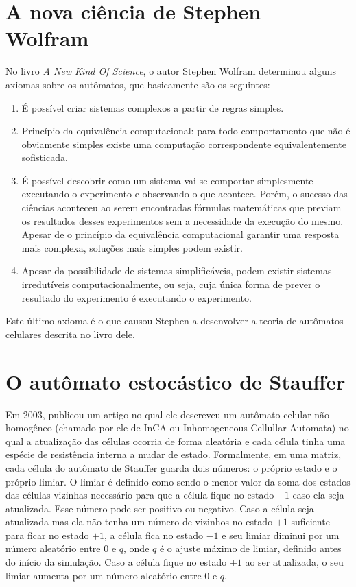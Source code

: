 \documentclass[
	12pt,				%
	openright,			%
	twoside,			%
	a4paper,			%
	english,			%
	french,				%
	spanish,			%
	brazil				%
	]{abntex2}
\begin{document}
\section*{A nova ciência de Stephen Wolfram}

No livro \textit{A New Kind Of Science}, o autor Stephen Wolfram \cite{wolfram} determinou alguns axiomas sobre os autômatos, que basicamente são os seguintes:
\begin{enumerate}
	\item É possível criar sistemas complexos a partir de regras simples.
	\item Princípio da equivalência computacional: para todo comportamento que não é obviamente simples  existe uma computação correspondente equivalentemente sofisticada.
	\item É possível descobrir como um sistema vai se comportar simplesmente executando o experimento e observando o que acontece. Porém, o sucesso das ciências aconteceu ao serem encontradas fórmulas matemáticas que previam os resultados desses experimentos sem a necessidade da execução do mesmo. Apesar de o princípio da equivalência computacional garantir uma resposta mais complexa, soluções mais simples podem existir.
	\item Apesar da possibilidade de sistemas simplificáveis, podem existir sistemas irredutíveis computacionalmente, ou seja, cuja única forma de prever o resultado do experimento é executando o experimento.
\end{enumerate}
Este último axioma é o que causou Stephen a desenvolver a teoria de autômatos celulares descrita no livro dele.

\section*{O autômato estocástico de Stauffer}

Em 2003,  publicou um artigo no qual ele descreveu um autômato celular não-homogêneo (chamado por ele de InCA ou Inhomogeneous Cellullar Automata) no qual a atualização das células ocorria de forma aleatória e cada célula tinha uma espécie de resistência interna a mudar de estado. Formalmente, em uma matriz, cada célula do autômato de Stauffer guarda dois números: o próprio estado e o próprio limiar. O limiar é definido como sendo o menor valor da soma dos estados das células vizinhas necessário para que a célula fique no estado $+1$ caso ela seja atualizada. Esse número pode ser positivo ou negativo. Caso a célula seja atualizada mas ela não tenha um número de vizinhos no estado $+1$ suficiente para ficar no estado $+1$, a célula fica no estado $-1$ e seu limiar diminui por um número aleatório entre $0$ e $q$, onde $q$ é o ajuste máximo de limiar, definido antes do início da simulação. Caso a célula fique no estado $+1$ ao ser atualizada, o seu limiar aumenta por um número aleatório entre $0$ e $q$.
\end{document}
